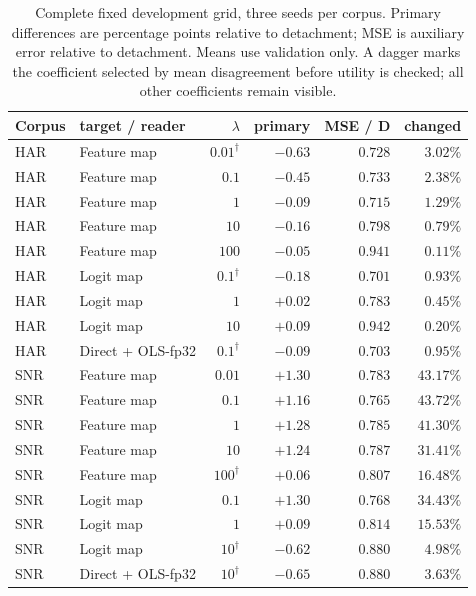 \begin{table}[htbp]
\centering
\caption{Complete fixed development grid, three seeds per corpus. Primary differences are percentage points relative to detachment; MSE is auxiliary error relative to detachment. Means use validation only. A dagger marks the coefficient selected by mean disagreement before utility is checked; all other coefficients remain visible.}
\label{tab:alignment_development}
\footnotesize
\begin{tabular}{llrrrr}
\toprule
Corpus & target / reader & $\lambda$ & primary & MSE / D & changed \\
\midrule
HAR & Feature map & $0.01^{\dagger}$ & $-0.63$ & $0.728$ & $3.02\%$ \\
HAR & Feature map & $0.1$ & $-0.45$ & $0.733$ & $2.38\%$ \\
HAR & Feature map & $1$ & $-0.09$ & $0.715$ & $1.29\%$ \\
HAR & Feature map & $10$ & $-0.16$ & $0.798$ & $0.79\%$ \\
HAR & Feature map & $100$ & $-0.05$ & $0.941$ & $0.11\%$ \\
HAR & Logit map & $0.1^{\dagger}$ & $-0.18$ & $0.701$ & $0.93\%$ \\
HAR & Logit map & $1$ & $+0.02$ & $0.783$ & $0.45\%$ \\
HAR & Logit map & $10$ & $+0.09$ & $0.942$ & $0.20\%$ \\
HAR & Direct + OLS-fp32 & $0.1^{\dagger}$ & $-0.09$ & $0.703$ & $0.95\%$ \\
\midrule
SNR & Feature map & $0.01$ & $+1.30$ & $0.783$ & $43.17\%$ \\
SNR & Feature map & $0.1$ & $+1.16$ & $0.765$ & $43.72\%$ \\
SNR & Feature map & $1$ & $+1.28$ & $0.785$ & $41.30\%$ \\
SNR & Feature map & $10$ & $+1.24$ & $0.787$ & $31.41\%$ \\
SNR & Feature map & $100^{\dagger}$ & $+0.06$ & $0.807$ & $16.48\%$ \\
SNR & Logit map & $0.1$ & $+1.30$ & $0.768$ & $34.43\%$ \\
SNR & Logit map & $1$ & $+0.09$ & $0.814$ & $15.53\%$ \\
SNR & Logit map & $10^{\dagger}$ & $-0.62$ & $0.880$ & $4.98\%$ \\
SNR & Direct + OLS-fp32 & $10^{\dagger}$ & $-0.65$ & $0.880$ & $3.63\%$ \\
\bottomrule
\end{tabular}
\end{table}
